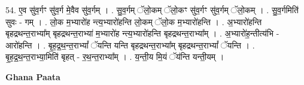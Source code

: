 \documentclass[17pt]{extarticle}
\begin{document}
54. ए॒व सु॑व॒र्गꣳ सु॑व॒र्ग मे॒वैव सु॑व॒र्गम् । . सु॒व॒र्गम् ॅलो॒कम् ॅलो॒कꣳ सु॑व॒र्गꣳ सु॑व॒र्गम् ॅलो॒कम् । . सु॒व॒र्गमिति॑ सुवः - गम् । . लो॒क म॒भ्यारो॑ह न्त्य॒भ्यारो॑हन्ति लो॒कम् ॅलो॒क म॒भ्यारो॑हन्ति । . अ॒भ्यारो॑हन्ति बृहद्रथन्त॒राभ्या᳚म् बृहद्रथन्त॒राभ्या॑ म॒भ्यारो॑ह न्त्य॒भ्यारो॑हन्ति बृहद्रथन्त॒राभ्या᳚म् । . अ॒भ्यारो॑ह॒न्तीत्य॑भि - आरो॑हन्ति । . बृ॒ह॒द्र॒थ॒न्त॒राभ्यां᳚ ॅयन्ति यन्ति बृहद्रथन्त॒राभ्या᳚म् बृहद्रथन्त॒राभ्यां᳚ ॅयन्ति । . बृ॒ह॒द्र॒थ॒न्त॒राभ्या॒मिति॑ बृहत् - र॒थ॒न्त॒राभ्या᳚म् । . य॒न्ती॒य मि॒यं ॅय॑न्ति यन्ती॒यम् । \newline

\textbf{Ghana Paata } \newline
\end{document}
